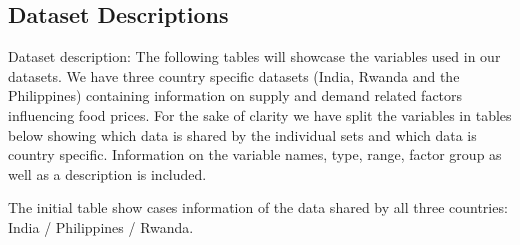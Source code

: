 \documentclass[11pt]{article}
\begin{document}
\subsection{Dataset Descriptions}

Dataset description: 
The following tables will showcase the variables used in our datasets. We have three country specific datasets (India, Rwanda and the Philippines) containing information on supply and demand related factors influencing food prices. For the sake of clarity we have split the variables in tables below showing which data is shared by the individual sets and which data is country specific. Information on the variable names, type, range, factor group as well as a description is included. 


The initial table show cases information of the data shared by all three countries: India / Philippines / Rwanda.
\FloatBarrier
\end{document}
